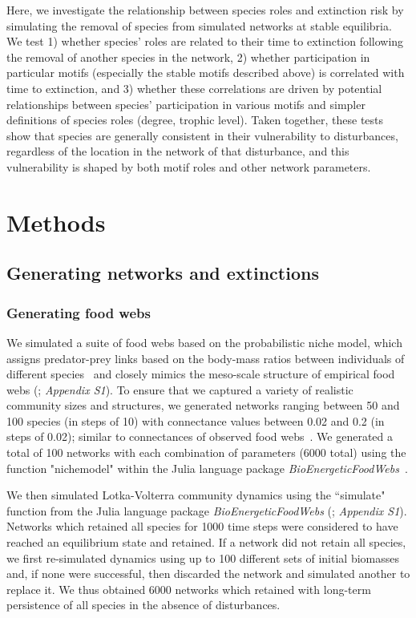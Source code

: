 \documentclass[12pt]{article}
\begin{document}
\begin{spacing}{2.0}
    
    Here, we investigate the relationship between species roles and extinction risk by simulating the removal of species from simulated networks at stable equilibria. We test 1) whether species' roles are related to their time to extinction following the removal of another species in the network, 2) whether participation in particular motifs (especially the stable motifs described above) is correlated with time to extinction, and 3) whether these correlations are driven by potential relationships between species' participation in various motifs and simpler definitions of species roles (degree, trophic level). Taken together, these tests show that species are generally consistent in their vulnerability to disturbances, regardless of the location in the network of that disturbance, and this vulnerability is shaped by both motif roles and other network parameters.


\section*{Methods}

    \subsection*{Generating networks and extinctions}

    	\subsubsection*{Generating food webs}
    
            We simulated a suite of food webs based on the probabilistic niche model, which assigns predator-prey links based on the body-mass ratios between individuals of different species~\citep{Williams2000,Delmas2017} and closely mimics the meso-scale structure of empirical food webs (\citealp{Stouffer2007}; \emph{Appendix S1}).
            To ensure that we captured a variety of realistic community sizes and structures, we generated networks ranging between 50 and 100 species (in steps of 10) with connectance values between 0.02 and 0.2 (in steps of 0.02); similar to connectances of observed food webs~\citep{Dunne2002e}. 
            We generated a total of 100 networks with each combination of parameters (6000 total) using the function "nichemodel" within the Julia language package \emph{BioEnergeticFoodWebs}~\citep{bioenergeticfw,Delmas2017}.


            We then simulated Lotka-Volterra community dynamics using the ``simulate" function from the Julia language package \emph{BioEnergeticFoodWebs} (\citealp{bioenergeticfw,Delmas2017}; \emph{Appendix S1}).
            Networks which retained all species for 1000 time steps were considered to have reached an equilibrium state and retained.
            If a network did not retain all species, we first re-simulated dynamics using up to 100 different sets of initial biomasses and, if none were successful, then discarded the network and simulated another to replace it.
            We thus obtained 6000 networks which retained with long-term persistence of all species in the absence of disturbances.


\end{spacing}
\end{document}
